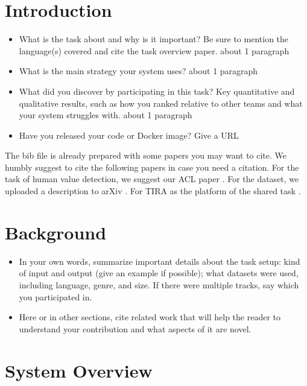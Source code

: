 \documentclass[11pt]{article}
\begin{document}
\section{Introduction}

\begin{itemize}
\item What is the task about and why is it important? Be sure to mention the language(s) covered and cite the task overview paper. about 1 paragraph

\item What is the main strategy your system uses? about 1 paragraph

\item What did you discover by participating in this task? Key quantitative and qualitative results, such as how you ranked relative to other teams and what your system struggles with. about 1 paragraph

\item Have you released your code or Docker image? Give a URL

\end{itemize}

The bib file is already prepared with some papers you may want to cite. We humbly suggest to cite the following papers in case you need a citation.
For the task of human value detection, we suggest our ACL paper \cite{kiesel:2022}.
For the dataset, we uploaded a description to arXiv \cite{mirzakhmedova:2023}.
For TIRA as the platform of the shared task \cite{froebe:2023}.

\section{Background}

\begin{itemize}
	\item In your own words, summarize important details about the task setup: kind of input and output (give an example if possible); what datasets were used, including language, genre, and size. If there were multiple tracks, say which you participated in.
	
	\item Here or in other sections, cite related work that will help the reader to understand your contribution and what aspects of it are novel.
	
\end{itemize}
\section{System Overview}
\end{document}
